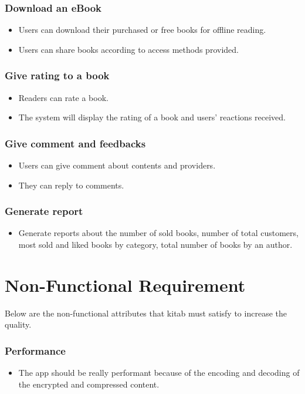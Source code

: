 	\subsubsection{Download an eBook}
	\begin{itemize}
		\item Users can download their purchased or free books for offline reading.
		\item Users can share books according to access methods provided.
	\end{itemize}

	\subsubsection{Give rating to a book}
	\begin{itemize}
		\item Readers can rate a book.
		\item The system will display the rating of a book and users’ reactions received.
	\end{itemize}

	\subsubsection{Give comment and feedbacks}
	\begin{itemize}
		\item Users can give comment about contents and providers.
		\item They can reply to comments.
	\end{itemize}

	\subsubsection{Generate report}
	\begin{itemize}
		\item Generate reports about the number of sold books, number of total customers, most sold and liked books by category, total number of books by an author.
	\end{itemize}

\section{Non-Functional Requirement}

Below are the non-functional attributes that kitab must satisfy to increase the quality.

	\subsubsection{Performance}
	\begin{itemize}
		\item The app should be really performant because of the encoding and decoding of the encrypted and compressed content. 
	\end{itemize}

